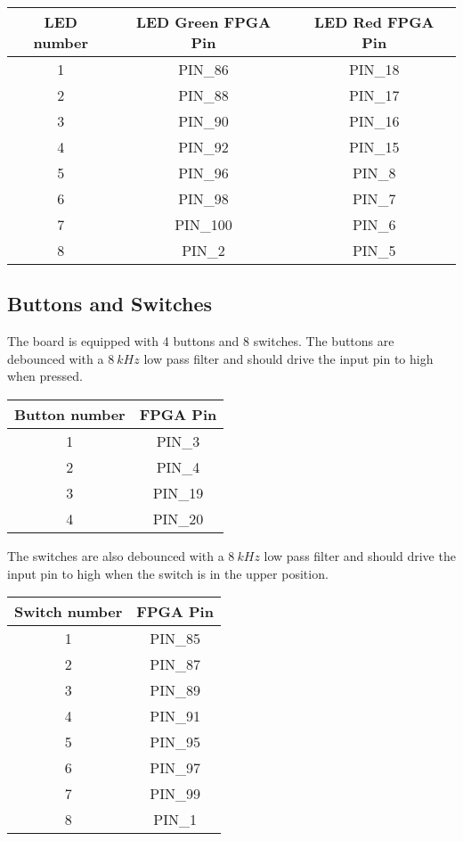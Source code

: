 \begin{center}
	\begin{tabular}{c c c}
		LED number & LED Green FPGA Pin & LED Red FPGA Pin \\
		\hline
		1 & PIN\_86 & PIN\_18 \\
		2 & PIN\_88 & PIN\_17 \\
		3 & PIN\_90 & PIN\_16 \\
		4 & PIN\_92 & PIN\_15 \\
		5 & PIN\_96 & PIN\_8 \\
		6 & PIN\_98 & PIN\_7 \\
		7 & PIN\_100 & PIN\_6 \\
		8 & PIN\_2 & PIN\_5 \\
		\hline
	\end{tabular}
\end{center}

\subsection{Buttons and Switches}
The board is equipped with 4 buttons and 8 switches.
The buttons are debounced with a $\SI{8}{kHz}$ low pass filter and should drive the input pin to high when pressed.

\begin{center}
	\begin{tabular}{c c}
		Button number & FPGA Pin \\
		\hline
		1 & PIN\_3 \\
		2 & PIN\_4 \\
		3 & PIN\_19 \\
		4 & PIN\_20 \\
		\hline
	\end{tabular}
\end{center}

The switches are also debounced with a $\SI{8}{kHz}$ low pass filter and should drive the input pin to high when the switch is in the upper position.

\begin{center}
	\begin{tabular}{c c}
		Switch number & FPGA Pin \\
		\hline
		1 & PIN\_85 \\
		2 & PIN\_87 \\
		3 & PIN\_89 \\
		4 & PIN\_91 \\
		5 & PIN\_95 \\
		6 & PIN\_97 \\
		7 & PIN\_99 \\
		8 & PIN\_1 \\
		\hline
	\end{tabular}
\end{center}


